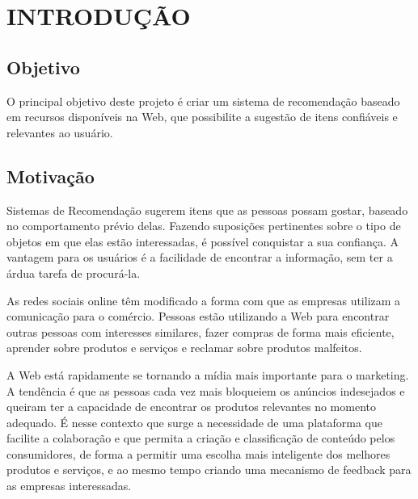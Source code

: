 \chapter{INTRODUÇÃO}  %

\section{Objetivo} %
\label{sec:objetivo}

 O principal objetivo deste projeto é criar um sistema de recomendação baseado em recursos disponíveis na Web, que possibilite a sugestão de itens confiáveis e relevantes ao usuário.


\section{Motivação} %
\label{sec:motivação}




 Sistemas de Recomendação sugerem itens que as pessoas possam gostar, baseado no comportamento prévio delas. Fazendo suposições pertinentes sobre o tipo de objetos em que elas estão interessadas, é possível conquistar a sua confiança. A vantagem para os usuários é a facilidade de encontrar a informação, sem ter a árdua tarefa de procurá-la.

 As redes sociais online têm modificado a forma com que as empresas utilizam a comunicação para o comércio. Pessoas estão utilizando a Web para encontrar outras pessoas com interesses similares, fazer compras de forma mais eficiente, aprender sobre produtos e serviços e reclamar sobre produtos malfeitos\cite{marketing_social_web}.

 A Web está rapidamente se tornando a mídia mais importante para o marketing. A tendência é que as pessoas cada vez mais bloqueiem os anúncios indesejados e queiram ter a capacidade de encontrar os produtos relevantes no momento adequado. É nesse contexto que surge a necessidade de uma plataforma que facilite a colaboração e que permita a criação e classificação de conteúdo pelos consumidores, de forma a permitir uma escolha mais inteligente dos melhores produtos e serviços, e ao mesmo tempo criando uma mecanismo de feedback para as empresas interessadas.

